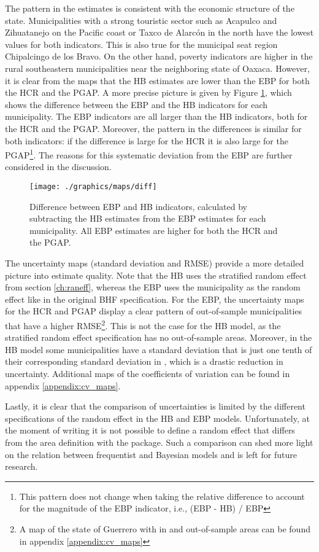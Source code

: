 The pattern in the estimates is consistent with the economic structure of the state.
Municipalities with a strong touristic sector such as Acapulco and Zihuatanejo on the Pacific coast or Taxco de Alarcón in the north have the lowest values for both indicators.
This is also true for the municipal seat region Chipalcingo de los Bravo.
On the other hand, poverty indicators are higher in the rural southeastern municipalities near the neighboring state of Oaxaca.
However, it is clear from the maps that the HB estimates are lower than the EBP for both the HCR and the PGAP.
A more precise picture is given by Figure \ref{fig:diff}, which shows the difference between the EBP and the HB indicators for each municipality.
The EBP indicators are all larger than the HB indicators, both for the HCR and the PGAP.
Moreover, the pattern in the differences is similar for both indicators: if the difference is large for the HCR it is also large for the PGAP\footnote{This pattern does not change when taking the relative difference to account for the magnitude of the EBP indicator, i.e., (EBP - HB) / EBP}.
The reasons for this systematic deviation from the EBP are further considered in the discussion.

\begin{figure}
    \centering
    \texttt{[image: ./graphics/maps/diff]}
    \caption[Difference between EBP and HB estimates.]{Difference between EBP and HB indicators, calculated by subtracting the HB estimates from the EBP estimates for each municipality. All EBP estimates are higher for both the HCR and the PGAP.}
    \label{fig:diff}
\end{figure}

The uncertainty maps (standard deviation and RMSE) provide a more detailed picture into estimate quality.
Note that the HB uses the stratified random effect from section \ref{ch:raneff}, whereas the EBP uses the municipality as the random effect like in the original BHF specification.
For the EBP, the uncertainty maps for the HCR and PGAP display a clear pattern of out-of-sample municipalities that have a higher RMSE\footnote{A map of the state of Guerrero with in and out-of-sample areas can be found in appendix \ref{appendix:cv_maps}}.
This is not the case for the HB model, as the stratified random effect specification has no out-of-sample areas.
Moreover, in the HB model some municipalities have a standard deviation that is just one tenth of their corresponding standard deviation in \cite{morelli_hierarchical_2021}, which is a drastic reduction in uncertainty.
Additional maps of the coefficients of variation can be found in appendix \ref{appendix:cv_maps}.

Lastly, it is clear that the comparison of uncertainties is limited by the different specifications of the random effect in the HB and EBP models.
Unfortunately, at the moment of writing it is not possible to define a random effect that differs from the area definition with the  package.
Such a comparison can shed more light on the relation between frequentist and Bayesian models and is left for future research.
